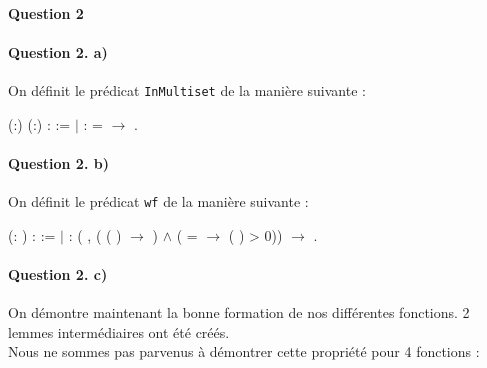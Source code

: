 \documentclass{report}
\begin{document}
\paragraph{Question 2}

\paragraph{Question 2. a)}

On définit le prédicat \texttt{InMultiset} de la manière suivante :

\noindent\begin{coqdoccode}
\coqdocemptyline
\coqdocnoindent
{}  (:) (:) :  := \coqdoceol
\coqdocindent{1.00em}
\ensuremath{|}  :    =  \ensuremath{\rightarrow}   .\coqdoceol
\coqdocemptyline
\coqdocemptyline
\end{coqdoccode}

\paragraph{Question 2. b)}

On définit le prédicat \texttt{wf} de la manière suivante :

\noindent\begin{coqdoccode}
\coqdocemptyline
\coqdocnoindent
{}  (: ) :  :=\coqdoceol
\coqdocindent{1.00em}
\ensuremath{|}  : (\coqdockw{\ensuremath{\forall}} , (  (  ) \ensuremath{\rightarrow} ) \ensuremath{\land} (   =  \ensuremath{\rightarrow} (  ) > 0)) \ensuremath{\rightarrow}  .\coqdoceol
\coqdocemptyline
\end{coqdoccode}

\paragraph{Question 2. c)}

On démontre maintenant la bonne formation de nos différentes fonctions. 2 lemmes intermédiaires ont été créés.\\
Nous ne sommes pas parvenus à démontrer cette propriété pour 4 fonctions :
\end{document}
